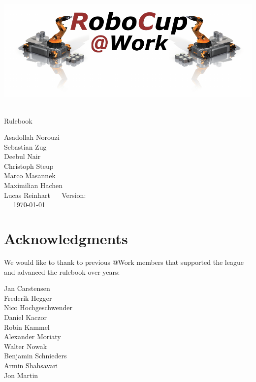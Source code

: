 
\begin{titlepage}
  \begin{center}
    {

      \includegraphics[width=\textwidth]{images/logo_RoboCupAtWork.pdf}\\[1.23ex]
    }
    \vspace{2.7 cm}
    \hrulefill\par
    {%
      \vspace*{.27cm}
      \Huge{\RCAW}\\[1.23ex]
      \Large Rulebook \\[2ex]
    }

    \hrulefill\par

    \vfill
    Asadollah Norouzi\\
  	Sebastian Zug\\
    Deebul Nair \\
    Christoph Steup \\
    Marco Masannek\\
    Maximilian Hachen\\
    Lucas Reinhart
    \vfill
    ~~ Version: \YEAR ~~ \\
    ~~  \today ~~ \\
  \end{center}

\newpage

\section*{Acknowledgments}

We would like to thank to previous @Work members that supported the league and
advanced the rulebook over years:

Jan Carstensen \\
Frederik Hegger\\
Nico Hochgeschwender \\
Daniel Kaczor \\
Robin Kammel \\
Alexander Moriaty \\
Walter Nowak \\
Benjamin Schnieders\\
Armin Shahsavari \\
Jon Martin \\



\end{titlepage}
